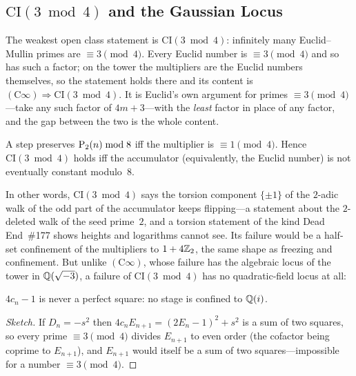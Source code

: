 \subsection{$\mathrm{CI}(3 \bmod 4)$ and the Gaussian Locus}
\label{sec:ci-three-mod-four}

The weakest open class statement is $\mathrm{CI}(3 \bmod 4)$: infinitely
many Euclid--Mullin primes are $\equiv 3 \pmod 4$.  Every Euclid number is
$\equiv 3 \pmod 4$ and so has such a factor; on the tower the multipliers
are the Euclid numbers themselves, so the statement holds there and its
content is $(\mathrm{C}\infty) \Rightarrow \mathrm{CI}(3 \bmod 4)$.  It is
Euclid's own argument for primes $\equiv 3 \pmod 4$---take any such
factor of $4m+3$---with the \emph{least} factor in place of any factor,
and the gap between the two is the whole content.

\begin{theorem}
\label{thm:ci-mod-eight}
A step preserves $\mathrm{P}_{2}(n) \bmod 8$ iff the multiplier is $\equiv 1
\pmod 4$.  Hence $\mathrm{CI}(3 \bmod 4)$ holds iff the accumulator
(equivalently, the Euclid number) is not eventually constant modulo~$8$.
\end{theorem}

In other words, $\mathrm{CI}(3 \bmod 4)$ says the torsion component
$\{\pm1\}$ of the $2$-adic walk of the odd part of the accumulator keeps
flipping---a statement about the $2$-deleted walk of the seed prime~$2$,
and a torsion statement of the kind Dead End~\#177 shows heights and
logarithms cannot see.  Its failure would be a half-set confinement of the
multipliers to $1 + 4\mathbb{Z}_2$, the same shape as freezing and confinement.
But unlike $(\mathrm{C}\infty)$, whose failure has the algebraic locus of
the tower in $\mathbb{Q}(\sqrt{-3})$, a failure of $\mathrm{CI}(3 \bmod 4)$ has
no quadratic-field locus at all:

\begin{theorem}
\label{thm:gaussian-empty}
$4c_n - 1$ is never a perfect square: no stage is confined to $\mathbb{Q}(i)$.
\end{theorem}

\begin{proof}[Sketch]
If $D_n = -s^2$ then $4c_nE_{n+1} = (2E_n-1)^2 + s^2$ is a sum of two
squares, so every prime $\equiv 3 \pmod 4$ divides $E_{n+1}$ to even order
(the cofactor being coprime to $E_{n+1}$), and $E_{n+1}$ would itself be a
sum of two squares---impossible for a number $\equiv 3 \pmod 4$.
\end{proof}

